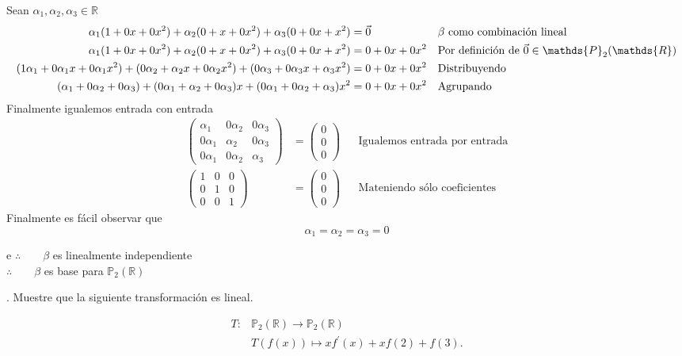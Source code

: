\documentclass[letterpaper]{article}
\newcommand{\R}{\mathds{R}}
\newcommand{\Po}{\mathds{P}_2(\mathds{R})}
\renewcommand{\*}{\cdot}
\newcommand{\Iden}{\begin{pmatrix}
		1 & 0 & 0\\
		0 & 1 & 0\\
		0 & 0 & 1 
\end{pmatrix}}
\theoremstyle{definition}
\begin{document}
Sean $ \alpha_1, \alpha_2, \alpha_3 \in \R $ 
\begin{align*}
	\alpha_1(1 + 0x + 0x^2) + \alpha_2(0 + x + 0x^2) + \alpha_3(0 + 0x + x^2) &= \vec{0} && \text{$ \beta $ como combinación lineal}\\
	\alpha_1(1 + 0x + 0x^2) + \alpha_2(0 + x + 0x^2) + \alpha_3(0 + 0x + x^2) &= 0 + 0x + 0x^2 && \text{Por definición de $ \vec{0} \in \Po $}\\
	(1\alpha_1 + 0\alpha_1x + 0\alpha_1x^2) + (0\alpha_2 + \alpha_2x + 0\alpha_2x^2) + (0\alpha_3 + 0\alpha_3x + \alpha_3x^2) &= 0 + 0x + 0x^2  && \text{Distribuyendo}\\
	(\alpha_1 + 0\alpha_2 + 0\alpha_3) + (0\alpha_1 + \alpha_2 + 0\alpha_3)x + (0\alpha_1 + 0\alpha_2 + \alpha_3)x^2 &= 0 + 0x + 0x^2 && \text{Agrupando}\\
\end{align*}
Finalmente igualemos entrada con entrada
\begin{align*}
	\begin{pmatrix}
	\alpha_1 & 0\alpha_2 & 0\alpha_3\\
	0\alpha_1 & \alpha_2 & 0\alpha_3\\
	0\alpha_1 & 0\alpha_2 & \alpha_3 
	\end{pmatrix} 
	& = \begin{pmatrix}
	0\\
	0\\
	0
	\end{pmatrix} && \text{Igualemos entrada por entrada}\\
	\Iden & = \begin{pmatrix}
	0\\
	0\\
	0
	\end{pmatrix} && \text{Mateniendo sólo coeficientes}
\end{align*}
Finalmente es fácil observar que 
\[ \alpha_1 = \alpha_2 = \alpha_3 = 0  \]
\begin{center}e
	$ \therefore \qquad \beta$ es linealmente independiente\\
	$ \therefore \qquad \beta$ es base para $ \Po $
\end{center}
. Muestre que la siguiente transformación es lineal.

\begin{align*}
     T \colon & \mathbb{P}_{2}(\mathbb{R})  \longrightarrow \mathbb{P}_{2}(\mathbb{R}) \\
     & T(f(x)) \mapsto  xf^{'}(x) +x f(2) + f(3). \\
 \end{align*}
\end{document}

